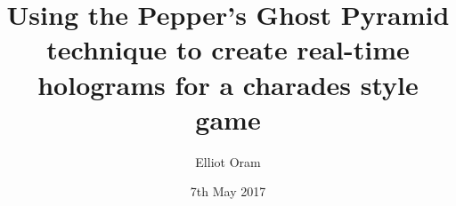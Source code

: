 
\title{Using the Pepper’s Ghost Pyramid technique to create real-time holograms for a charades style game}

\author{Elliot Oram}




\date{7th May 2017} %




\maketitle



